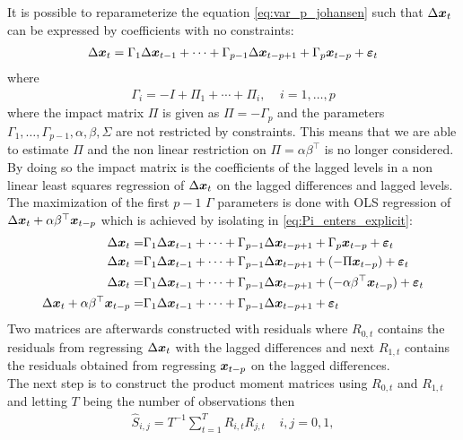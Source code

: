 \noindent It is possible to reparameterize the equation \eqref{eq:var_p_johansen} such that $\Delta \boldsymbol{x}_t$ can be expressed by coefficients with no constraints:
\begin{align}\label{eq:Pi_enters_explicit}
    \Delta \boldsymbol{x}_t=\Gamma_1\Delta \boldsymbol{x}_{t-1}+\cdots+\Gamma_{p-1}\Delta \boldsymbol{x}_{t-p+1}+\Gamma_{p}\boldsymbol{x}_{t-p}+\boldsymbol{\varepsilon}_t
\end{align}
where 
\begin{align*}
    \Gamma_i=-I+\Pi_1+\cdots+\Pi_i,\;\;\;\; i=1,\ldots,p
\end{align*}
where the impact matrix $\Pi$ is given as $\Pi=-\Gamma_p$ and the parameters $\Gamma_1,\ldots,\Gamma_{p-1},\alpha,\beta,\Sigma$ are not restricted by constraints. This means that we are able to estimate $\Pi$ and the non linear restriction on $\Pi=\alpha\beta^\top$ is no longer considered. By doing so the impact matrix is the coefficients of the lagged levels in a non linear least squares regression of $\Delta \boldsymbol{x}_t$ on the lagged differences and lagged levels.\\
\noindent The maximization of the first $p-1$ $\Gamma$ parameters is done with OLS regression of $\Delta \boldsymbol{x}_t+\alpha\beta^\top \boldsymbol{x}_{t-p}$ which is achieved by isolating in \eqref{eq:Pi_enters_explicit}:
\begin{align}
    \Delta \boldsymbol{x}_t=&\Gamma_1\Delta \boldsymbol{x}_{t-1}+\cdots+\Gamma_{p-1}\Delta \boldsymbol{x}_{t-p+1}+\Gamma_{p}\boldsymbol{x}_{t-p}+\boldsymbol{\varepsilon}_t\\
    \Delta \boldsymbol{x}_t=&\Gamma_1\Delta \boldsymbol{x}_{t-1}+\cdots+ \Gamma_{p-1}\Delta \boldsymbol{x}_{t-p+1}+(-\Pi \boldsymbol{x}_{t-p})+\boldsymbol{\varepsilon}_t\\
    \Delta \boldsymbol{x}_t=&\Gamma_1\Delta \boldsymbol{x}_{t-1}+\cdots+ \Gamma_{p-1}\Delta \boldsymbol{x}_{t-p+1}+(-\alpha\beta^\top \boldsymbol{x}_{t-p})+\boldsymbol{\varepsilon}_t\\
    \Delta \boldsymbol{x}_t +\alpha\beta^\top \boldsymbol{x}_{t-p}=&\Gamma_1\Delta \boldsymbol{x}_{t-1}+\cdots+\Gamma_{p-1}\Delta \boldsymbol{x}_{t-p+1}+\boldsymbol{\varepsilon}_t
\end{align}
Two matrices are afterwards constructed with residuals where $R_{0,t}$ contains the residuals from regressing $\Delta \boldsymbol{x}_t$ with the lagged differences and next $R_{1,t}$ contains the residuals obtained from regressing $\boldsymbol{x}_{t-p}$ on the lagged differences.\\
The next step is to construct the product moment matrices using $R_{0,t}$ and $R_{1,t}$ and letting $T$ being the number of observations then
\begin{align}\label{eq:prod_mom_mat}
\hat{S}_{i,j}=T^{-1}\sum_{t=1}^
T R_{i,t}R_{j,t}\;\;\;\; i,j=0,1,
\end{align}
